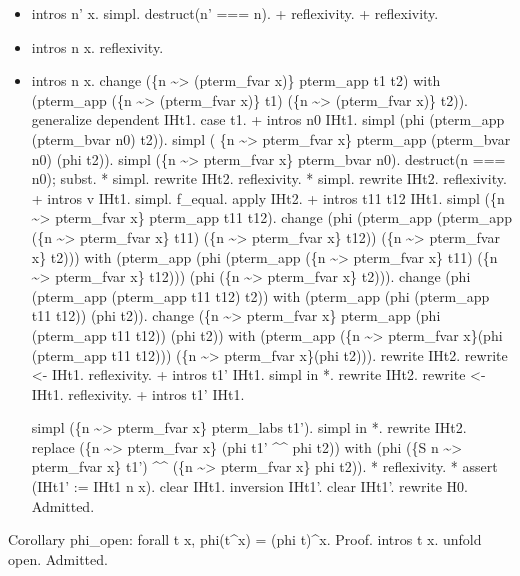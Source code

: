 \begin{itemize}
\item  intros n' x.
    simpl.
    destruct(n' === n).
    + reflexivity.
    + reflexivity.

\item  intros n x.
    reflexivity.

\item  intros n x.
    change (\{n \~{}> (pterm\_fvar x)\} pterm\_app t1 t2) with (pterm\_app (\{n \~{}> (pterm\_fvar x)\} t1) (\{n \~{}> (pterm\_fvar x)\} t2)).
    generalize dependent IHt1.
    case t1.
    + intros n0 IHt1.
      simpl (phi (pterm\_app (pterm\_bvar n0) t2)).
      simpl ( \{n \~{}> pterm\_fvar x\} pterm\_app (pterm\_bvar n0) (phi t2)).
      simpl (\{n \~{}> pterm\_fvar x\} pterm\_bvar n0).
      destruct(n === n0); subst.
      * simpl.
        rewrite IHt2.
        reflexivity.
      * simpl.
        rewrite IHt2.
        reflexivity.
    + intros v IHt1.
      simpl.
      f\_equal.
      apply IHt2. 
    + intros t11 t12 IHt1.
      simpl (\{n \~{}> pterm\_fvar x\} pterm\_app t11 t12).
      change (phi
    (pterm\_app (pterm\_app (\{n \~{}> pterm\_fvar x\} t11) (\{n \~{}> pterm\_fvar x\} t12))
               (\{n \~{}> pterm\_fvar x\} t2))) with
    (pterm\_app (phi (pterm\_app (\{n \~{}> pterm\_fvar x\} t11) (\{n \~{}> pterm\_fvar x\} t12)))
               (phi (\{n \~{}> pterm\_fvar x\} t2))).
      change (phi (pterm\_app (pterm\_app t11 t12) t2)) with
          (pterm\_app (phi (pterm\_app t11 t12)) (phi t2)).
      change (\{n \~{}> pterm\_fvar x\} pterm\_app (phi (pterm\_app t11 t12)) (phi t2)) with (pterm\_app (\{n \~{}> pterm\_fvar x\}(phi (pterm\_app t11 t12))) (\{n \~{}> pterm\_fvar x\}(phi t2))).
      rewrite IHt2.
      rewrite <- IHt1.
      reflexivity.
    + intros t1' IHt1.
      simpl in *.
      rewrite IHt2.
      rewrite <- IHt1.
      reflexivity.
    + intros t1' IHt1.


      simpl (\{n \~{}> pterm\_fvar x\} pterm\_labs t1').
      simpl in *.
      rewrite IHt2.
      replace (\{n \~{}> pterm\_fvar x\} (phi t1' \^{}\^{} phi t2)) with (phi (\{S n \~{}> pterm\_fvar x\} t1') \^{}\^{} (\{n \~{}> pterm\_fvar x\} phi t2)).
      * reflexivity.
      * assert (IHt1' := IHt1 n x).
        clear IHt1.
        inversion IHt1'. clear IHt1'.
        rewrite H0.
        Admitted.

\end{itemize}


Corollary phi\_open: forall t x, phi(t\^{}x) = (phi t)\^{}x.
Proof.
  intros t x.
  unfold open.
  Admitted.
  

